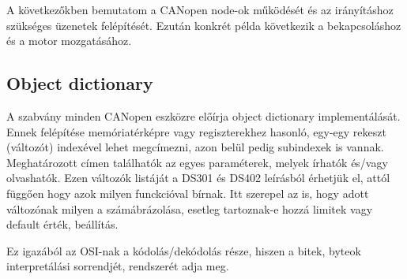 	
	A következőkben bemutatom a CANopen node-ok működését és az irányításhoz szükséges üzenetek felépítését. Ezután konkrét példa következik a bekapcsoláshoz és a motor mozgatásához.
	
	
	
	\subsection{Object dictionary}
	
	A szabvány minden CANopen eszközre előírja object dictionary implementálását. Ennek felépítése memóriatérképre vagy regiszterekhez hasonló, egy-egy rekeszt (változót) indexével lehet megcímezni, azon belül pedig subindexek is vannak. Meghatározott címen találhatók az egyes paraméterek, melyek írhatók és/vagy olvashatók. Ezen változók listáját a DS301 és DS402 leírásból érhetjük el, attól függően hogy azok milyen funckcióval bírnak. Itt szerepel az is, hogy adott változónak milyen a számábrázolása, esetleg tartoznak-e hozzá limitek vagy default érték, beállítás.
	


	
	Ez igazából az OSI-nak a kódolás/dekódolás része, hiszen a bitek, byteok interpretálási sorrendjét, rendszerét adja meg.
	
